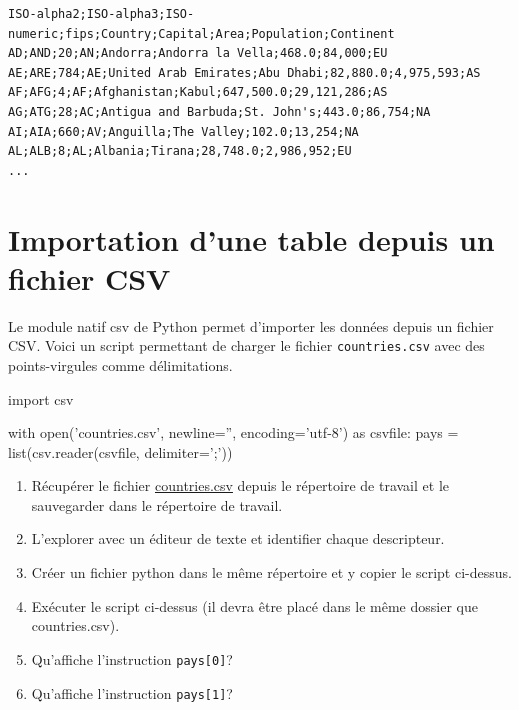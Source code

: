 \begin{lstlisting}[numbers=none]
ISO-alpha2;ISO-alpha3;ISO-numeric;fips;Country;Capital;Area;Population;Continent
AD;AND;20;AN;Andorra;Andorra la Vella;468.0;84,000;EU
AE;ARE;784;AE;United Arab Emirates;Abu Dhabi;82,880.0;4,975,593;AS
AF;AFG;4;AF;Afghanistan;Kabul;647,500.0;29,121,286;AS
AG;ATG;28;AC;Antigua and Barbuda;St. John's;443.0;86,754;NA
AI;AIA;660;AV;Anguilla;The Valley;102.0;13,254;NA
AL;ALB;8;AL;Albania;Tirana;28,748.0;2,986,952;EU
...
\end{lstlisting}

\pagebreak

\section{Importation d'une table depuis un fichier CSV}

Le module natif csv de Python permet d'importer les données depuis un fichier CSV.
Voici un script permettant de charger le fichier \verb|countries.csv| avec des points-virgules comme délimitations.


\begin{CodePythontexAlt}[Largeur=1\linewidth,Centre,PremLigne=1, lineNumbers=false]{}
import csv

with open('countries.csv', newline='', encoding='utf-8') as csvfile:
    pays = list(csv.reader(csvfile, delimiter=';'))
\end{CodePythontexAlt}


\begin{exercice_cours}{}
\begin{enumerate}
	\item  Récupérer le fichier \href{assets/countries.csv}{countries.csv} depuis le répertoire de travail et le sauvegarder dans le répertoire de travail.
	\item L'explorer avec un éditeur de texte et identifier chaque descripteur.
	\item Créer un fichier python dans le même répertoire et y copier le script ci-dessus.
	\item Exécuter le script ci-dessus (il devra être placé dans le même dossier que countries.csv).
	\item Qu'affiche l'instruction \texttt{pays[0]}?
	\item Qu'affiche l'instruction \texttt{pays[1]}?
\end{enumerate}
\end{exercice_cours}

